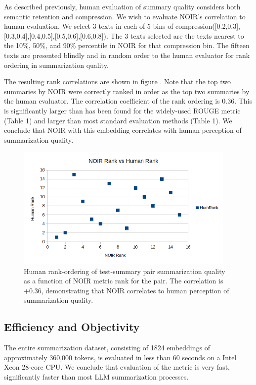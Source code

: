 \documentclass{article}
\begin{document}
{As described previously, human evaluation of summary quality considers both semantic retention and compression.  
We wish to evaluate NOIR's correlation to human evaluation.  
We select 3 texts in each of 5 bins of compression([0.2,0.3],[0.3,0.4],[0.4,0.5],[0.5,0.6],[0.6,0.8]).  
The 3 texts selected  are the texts nearest to the 10\%, 50\%, and 90\% percentile
in NOIR for that compression bin.
The fifteen texts are presented blindly and in random order to the human evaluator for rank ordering in summarization quality.

The resulting rank correlations are shown in figure  .
Note that the top two summaries by NOIR were correctly ranked in order as the top
two summaries by the human evaluator.  
The correlation coefficient of the rank ordering is 0.36.
This is significantly larger than has been found for the widely-used ROUGE metric \citep{5071230} (Table 1) and larger than most
standard evaluation methods \citep{supert} (Table 1).
We conclude that NOIR with this embedding correlates with human perception of summarization quality.

\begin{figure}
	\centering
	\includegraphics[height=6cm]{humaneval.png}
	\caption{Human rank-ordering of test-summary pair summarization quality as a function of NOIR metric rank for the pair.  The correlation is +0.36, demonstrating that NOIR correlates to human perception of summarization quality.}
	\label{fig:humaneval}
\end{figure}

\subsection{Efficiency and Objectivity}

The entire summarization dataset, consisting of 1824 embeddings of approximately 360,000 tokens, is evaluated in less than 60 seconds on a Intel Xeon 28-core CPU.
We conclude that evaluation of the metric is very fast, significantly faster than most LLM summarization processes.

}
\end{document}
